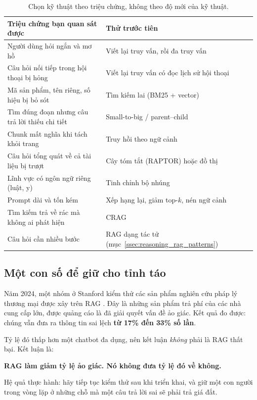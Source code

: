 \begin{table}[H]
\centering
\small
\begin{tabularx}{\textwidth}{@{}XX@{}}
\toprule
\textbf{Triệu chứng bạn quan sát được} & \textbf{Thử trước tiên} \\
\midrule
Người dùng hỏi ngắn và mơ hồ & Viết lại truy vấn, rồi đa truy vấn \\
Câu hỏi nối tiếp trong hội thoại bị hỏng & Viết lại truy vấn có đọc lịch sử hội thoại \\
Mã sản phẩm, tên riêng, số hiệu bị bỏ sót & Tìm kiếm lai (BM25 + vector) \\
Tìm đúng đoạn nhưng câu trả lời thiếu chi tiết & Small-to-big / parent--child \\
Chunk mất nghĩa khi tách khỏi trang & Truy hồi theo ngữ cảnh \\
Câu hỏi tổng quát về cả tài liệu bị trượt & Cây tóm tắt (RAPTOR) hoặc đồ thị \\
Lĩnh vực có ngôn ngữ riêng (luật, y) & Tinh chỉnh bộ nhúng \\
Prompt dài và tốn kém & Xếp hạng lại, giảm top-$k$, nén ngữ cảnh \\
Tìm kiếm trả về rác mà không ai phát hiện & CRAG \\
Câu hỏi cần nhiều bước & RAG dạng tác tử (mục~\ref{ssec:reasoning_rag_patterns}) \\
\bottomrule
\end{tabularx}
\caption{Chọn kỹ thuật theo triệu chứng, không theo độ mới của kỹ thuật.}
\label{tab:rag_symptom}
\end{table}

\subsection{Một con số để giữ cho tỉnh táo}
\label{ssec:rag_sober}

Năm 2024, một nhóm ở Stanford kiểm thử các sản phẩm nghiên cứu pháp lý thương mại được xây trên RAG \cite{magesh2024hallucination}. Đây là những sản phẩm trả phí của các nhà cung cấp lớn, được quảng cáo là đã giải quyết vấn đề ảo giác. Kết quả đo được: chúng vẫn đưa ra thông tin sai lệch \textbf{từ 17\% đến 33\% số lần}.

Tỷ lệ đó thấp hơn một chatbot đa dụng, nên kết luận \emph{không} phải là RAG thất bại. Kết luận là:

\begin{center}
\textbf{RAG làm giảm tỷ lệ ảo giác. Nó không đưa tỷ lệ đó về không.}
\end{center}

\noindent Hệ quả thực hành: hãy tiếp tục kiểm thử sau khi triển khai, và giữ một con người trong vòng lặp ở những chỗ mà một câu trả lời sai sẽ phải trả giá đắt.
